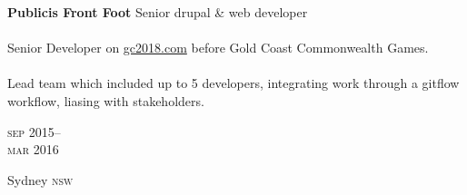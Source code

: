 \begin{minipage}[t]{0.75\textwidth}
\textbf{Publicis Front Foot}\phantom{..} Senior drupal \& web developer \\
\\
Senior Developer on \href{https://www.gc2018.com/}{gc2018.com} 
before Gold Coast Commonwealth Games.
\\
\\
Lead team which included up to 5 developers, integrating work through a 
gitflow workflow, liasing with stakeholders.
\\
{\small
\textit{}
\par}
\end{minipage}
\begin{minipage}[t]{0.25\textwidth}
{
\hfill \textsc{sep} 2015--\\ 
\hspace*{0pt} \hfill \textsc{mar} 2016
\par
{\small\hfill Sydney \textsc{nsw}}
}
\end{minipage}
\\




